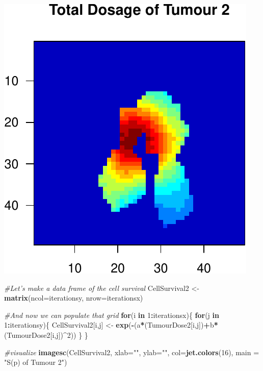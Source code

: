 \documentclass[]{article}
\newenvironment{Shaded}{\begin{snugshade}}{\end{snugshade}}
\newcommand{\KeywordTok}[1]{\textcolor[rgb]{0.13,0.29,0.53}{\textbf{#1}}}
\newcommand{\DataTypeTok}[1]{\textcolor[rgb]{0.13,0.29,0.53}{#1}}
\newcommand{\DecValTok}[1]{\textcolor[rgb]{0.00,0.00,0.81}{#1}}
\newcommand{\StringTok}[1]{\textcolor[rgb]{0.31,0.60,0.02}{#1}}
\newcommand{\CommentTok}[1]{\textcolor[rgb]{0.56,0.35,0.01}{\textit{#1}}}
\newcommand{\ControlFlowTok}[1]{\textcolor[rgb]{0.13,0.29,0.53}{\textbf{#1}}}
\newcommand{\OperatorTok}[1]{\textcolor[rgb]{0.81,0.36,0.00}{\textbf{#1}}}
\newcommand{\NormalTok}[1]{#1}
\begin{document}
\begin{center}\includegraphics{TumourSurvival_files/figure-latex/unnamed-chunk-13-2} \end{center}

\begin{Shaded}
\begin{Highlighting}[]
\CommentTok{#Let's make a data frame of the cell survival}
\NormalTok{CellSurvival2 <-}\StringTok{ }\KeywordTok{matrix}\NormalTok{(}\DataTypeTok{ncol=}\NormalTok{iterationsy, }\DataTypeTok{nrow=}\NormalTok{iterationsx)}

\CommentTok{#And now we can populate that grid}
\ControlFlowTok{for}\NormalTok{(i }\ControlFlowTok{in} \DecValTok{1}\OperatorTok{:}\NormalTok{iterationsx)\{}
  \ControlFlowTok{for}\NormalTok{(j }\ControlFlowTok{in} \DecValTok{1}\OperatorTok{:}\NormalTok{iterationsy)\{}
\NormalTok{    CellSurvival2[i,j] <-}\StringTok{ }\KeywordTok{exp}\NormalTok{(}\OperatorTok{-}\NormalTok{(a}\OperatorTok{*}\NormalTok{(TumourDose2[i,j])}\OperatorTok{+}\NormalTok{b}\OperatorTok{*}\NormalTok{(TumourDose2[i,j])}\OperatorTok{^}\DecValTok{2}\NormalTok{))}
\NormalTok{  \}}
\NormalTok{\}}

\CommentTok{#visualize}
\KeywordTok{imagesc}\NormalTok{(CellSurvival2, }\DataTypeTok{xlab=}\StringTok{""}\NormalTok{, }\DataTypeTok{ylab=}\StringTok{""}\NormalTok{, }\DataTypeTok{col=}\KeywordTok{jet.colors}\NormalTok{(}\DecValTok{16}\NormalTok{), }\DataTypeTok{main =} \StringTok{"S(p) of Tumour 2"}\NormalTok{)}
\end{Highlighting}
\end{Shaded}
\end{document}
